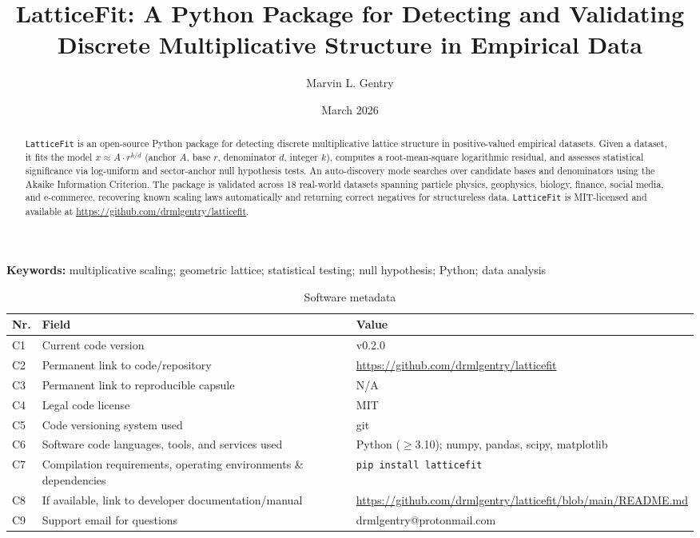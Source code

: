\documentclass[10pt,a4paper]{article}
\title{\textbf{LatticeFit}: A Python Package for Detecting and
Validating Discrete Multiplicative Structure in Empirical Data}
\author[1]{Marvin L. Gentry}
\affil[1]{Independent Researcher, Seattle, WA, USA.
  \texttt{drmlgentry@protonmail.com}}
\date{March 2026}
\begin{document}
\maketitle

\begin{abstract}
\texttt{LatticeFit} is an open-source Python package for detecting
discrete multiplicative lattice structure in positive-valued empirical
datasets. Given a dataset, it fits the model $x \approx A \cdot r^{k/d}$
(anchor $A$, base $r$, denominator $d$, integer $k$), computes a
root-mean-square logarithmic residual, and assesses statistical
significance via log-uniform and sector-anchor null hypothesis tests.
An auto-discovery mode searches over candidate bases and denominators
using the Akaike Information Criterion. The package is validated
across 18 real-world datasets spanning particle physics, geophysics,
biology, finance, social media, and e-commerce, recovering known
scaling laws automatically and returning correct negatives for
structureless data. \texttt{LatticeFit} is MIT-licensed and available
at \url{https://github.com/drmlgentry/latticefit}.
\end{abstract}

\textbf{Keywords:} multiplicative scaling; geometric lattice;
statistical testing; null hypothesis; Python; data analysis

\vspace{1em}

\begin{table}[h!]
\centering
\caption{Software metadata}
\label{tab:meta}
\small
\begin{tabular}{llp{7cm}}
\toprule
\textbf{Nr.} & \textbf{Field} & \textbf{Value} \\
\midrule
C1 & Current code version & v0.2.0 \\
C2 & Permanent link to code/repository &
     \url{https://github.com/drmlgentry/latticefit} \\
C3 & Permanent link to reproducible capsule & N/A \\
C4 & Legal code license & MIT \\
C5 & Code versioning system used & git \\
C6 & Software code languages, tools, and services used &
     Python ($\geq$3.10); numpy, pandas, scipy, matplotlib \\
C7 & Compilation requirements, operating environments \& dependencies &
     \texttt{pip install latticefit} \\
C8 & If available, link to developer documentation/manual &
     \url{https://github.com/drmlgentry/latticefit/blob/main/README.md} \\
C9 & Support email for questions & drmlgentry@protonmail.com \\
\bottomrule
\end{tabular}
\end{table}
\end{document}
